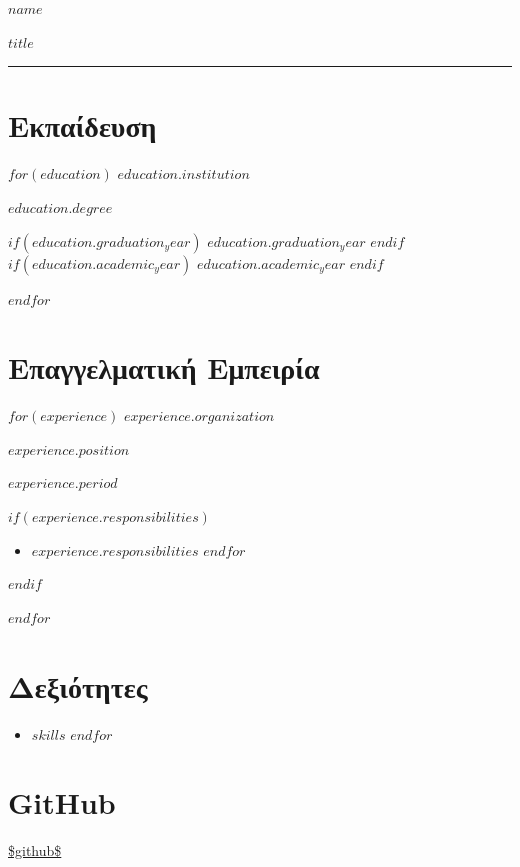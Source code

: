 \documentclass[11pt,a4paper]{article}
\begin{document}
\begin{center}
{\LARGE\bfseries\color{purple} $name$}

\vspace{5mm}
{\color{darkpurple} $title$}
\end{center}

\vspace{3mm}
{\color{lightpurple}\hrule}
\vspace{5mm}

\section*{Εκπαίδευση}

$for(education)$
{\color{darkpurple}\textbf{$education.institution$}}

$education.degree$

$if(education.graduation_year)$
$education.graduation_year$
$endif$
$if(education.academic_year)$
$education.academic_year$
$endif$

\vspace{3mm}
$endfor$

\section*{Επαγγελματική Εμπειρία}

$for(experience)$
{\color{darkpurple}\textbf{$experience.organization$}}

$experience.position$

\textit{$experience.period$}

$if(experience.responsibilities)$
\begin{itemize}
$for(experience.responsibilities)$
\item $experience.responsibilities$
$endfor$
\end{itemize}
$endif$

\vspace{3mm}
$endfor$

\section*{Δεξιότητες}

\begin{itemize}
$for(skills)$
\item $skills$
$endfor$
\end{itemize}

\section*{GitHub}

\url{$github$}
\end{document}
